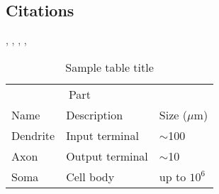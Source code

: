 \documentclass{article}
\begin{document}

\subsection{Citations}

\cite{kingma2014adam}, \cite{jahani2021doubly}, \cite{sadiev2022stochastic}, \cite{beznosikov2022scaled}, \cite{stich2019unified}



\begin{table}
	\caption{Sample table title}
	\centering
	\begin{tabular}{lll}
		\toprule
		\multicolumn{2}{c}{Part}                   \\
		\cmidrule(r){1-2}
		Name     & Description     & Size ($\mu$m) \\
		\midrule
		Dendrite & Input terminal  & $\sim$100     \\
		Axon     & Output terminal & $\sim$10      \\
		Soma     & Cell body       & up to $10^6$  \\
		\bottomrule
	\end{tabular}
	\label{tab:table}
\end{table}
\fi
{}
\end{document}
